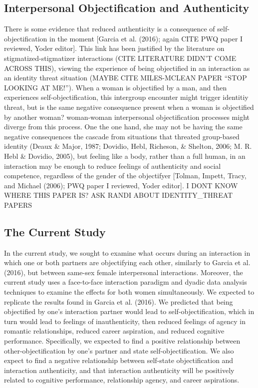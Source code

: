 \documentclass[
  man]{apa6}
\begin{document}
\subsection{Interpersonal Objectification and
Authenticity}\label{interpersonal-objectification-and-authenticity}

There is some evidence that reduced authenticity is a consequence of
self-objectification in the moment {[}Garcia et al. (2016); again CITE
PWQ paper I reviewed, Yoder editor{]}. This link has been justified by
the literature on stigmatized-stigmatizer interactions (CITE LITERATURE
DIDN'T COME ACROSS THIS), viewing the experience of being objectified in
an interaction as an identity threat situation (MAYBE CITE MILES-MCLEAN
PAPER \enquote{STOP LOOKING AT ME!}). When a woman is objectified by a
man, and then experiences self-objectification, this intergroup
encounter might trigger identitiy threat, but is the same negative
consequence present when a woman is objectified by another woman?
woman-woman interpersonal objectification processes might diverge from
this process. One the one hand, she may not be having the same negative
consequences the cascade from situations that threated group-based
identity (Deaux \& Major, 1987; Dovidio, Hebl, Richeson, \& Shelton,
2006; M. R. Hebl \& Dovidio, 2005), but feeling like a body, rather than
a full human, in an interaction may be enough to reduce feelings of
authenticity and social competence, regardless of the gender of the
objectifyer {[}Tolman, Impett, Tracy, and Michael (2006); PWQ paper I
reviewed, Yoder editor{]}. I DONT KNOW WHERE THIS PAPER IS? ASK RANDI
ABOUT IDENTITY\_THREAT PAPERS

\subsection{The Current Study}\label{the-current-study}

In the current study, we sought to examine what occurs during an
interaction in which one or both partners are objectifying each other,
similarly to Garcia et al. (2016), but between same-sex female
interpersonal interactions. Moreover, the current study uses a
face-to-face interaction paradigm and dyadic data analysis techniques to
examine the effects for both women simultaneously. We expected to
replicate the results found in Garcia et al. (2016). We predicted that
being objectified by one's interaction partner would lead to
self-objectification, which in turn would lead to feelings of
inauthenticity, then reduced feelings of agency in romantic
relationships, reduced career aspiration, and reduced cognitive
performance. Specifically, we expected to find a positive relationship
between other-objectification by one's partner and state
self-objectification. We also expect to find a negative relationship
between self-state objectification and interaction authenticity, and
that interaction authenticity will be positively related to cognitive
performance, relationship agency, and career aspirations.
\end{document}
